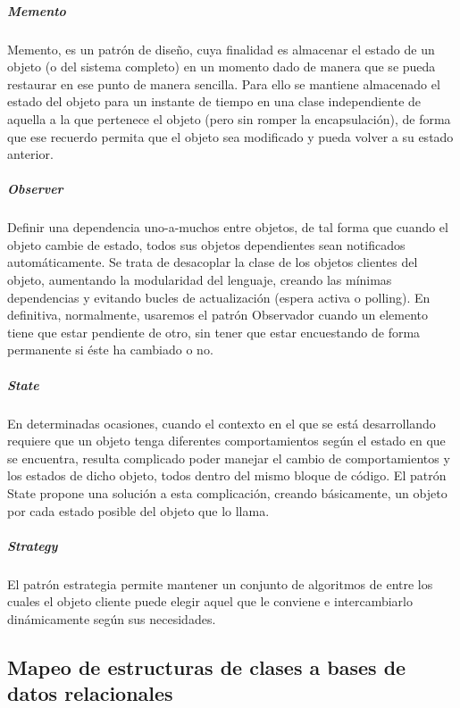\vspace*{\fill}
\noindent{}
\subparagraph{Memento}
Memento, es un patrón de diseño, cuya finalidad es almacenar el estado de un objeto (o del sistema completo) en un momento dado de manera que se pueda restaurar en ese punto de manera sencilla. Para ello se mantiene almacenado el estado del objeto para un instante de tiempo en una clase independiente de aquella a la que pertenece el objeto (pero sin romper la encapsulación), de forma que ese recuerdo permita que el objeto sea modificado y pueda volver a su estado anterior.\\
\vspace*{\fill}
\noindent{}
\subparagraph{Observer}
Definir una dependencia uno-a-muchos entre objetos, de tal forma que cuando el objeto cambie de estado, todos sus objetos dependientes sean notificados automáticamente. Se trata de desacoplar la clase de los objetos clientes del objeto, aumentando la modularidad del lenguaje, creando las mínimas dependencias y evitando bucles de actualización (espera activa o polling). En definitiva, normalmente, usaremos el patrón Observador cuando un elemento tiene que estar pendiente de otro, sin tener que estar encuestando de forma permanente si éste ha cambiado o no.\\
\vspace*{\fill}
\noindent{}
\subparagraph{State}
En determinadas ocasiones, cuando el contexto en el que se está desarrollando requiere que un objeto tenga diferentes comportamientos según el estado en que se encuentra, resulta complicado poder manejar el cambio de comportamientos y los estados de dicho objeto, todos dentro del mismo bloque de código. El patrón State propone una solución a esta complicación, creando básicamente, un objeto por cada estado posible del objeto que lo llama.\\
\vspace*{\fill}
\noindent{}
\subparagraph{Strategy}
El patrón estrategia permite mantener un conjunto de algoritmos de entre los cuales el objeto cliente puede elegir aquel que le conviene e intercambiarlo dinámicamente según sus necesidades.\\
\vspace*{\fill}
\noindent{}
\subsection{Mapeo de estructuras de clases a bases de datos relacionales}

